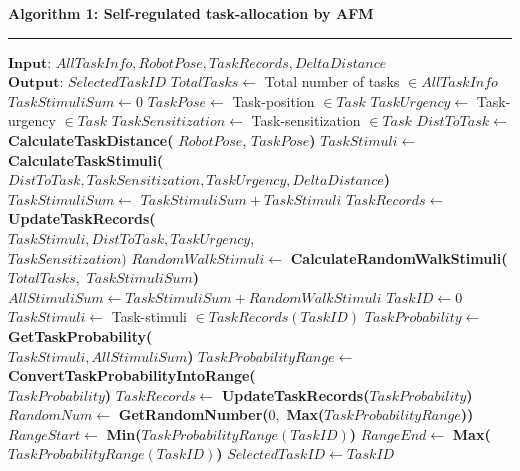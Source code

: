\documentclass[final,5p,times,twocolumn]{elsarticle}
\newcommand{\HRule}{\rule{\linewidth}{0.3mm}}
\begin{document}
\textbf{Algorithm 1: Self-regulated task-allocation by AFM}
\vspace{-3mm}
\newline
\HRule
\begin{algorithmic}[1]
\begin{small}
\label{alg:task-selector}
\State $\textbf{Input: } AllTaskInfo, RobotPose, TaskRecords, DeltaDistance$
\State $\textbf{Output: } SelectedTaskID$
\State {}
\State $TotalTasks \gets$  Total number of tasks $\in AllTaskInfo$  
\State $ TaskStimuliSum \gets 0 $
\State $ TaskPose \gets  $ Task-position  $ \in Task$
\State $ TaskUrgency \gets $ Task-urgency $ \in Task$
\State $ TaskSensitization \gets $ Task-sensitization $\in Task$
\State $ DistToTask \gets$
\textbf{CalculateTaskDistance(}
\newline
$RobotPose$, $TaskPose$\textbf{)}
\State $ TaskStimuli \gets  $ \textbf{CalculateTaskStimuli(}
\newline
$DistToTask, TaskSensitization, TaskUrgency, DeltaDistance$\textbf{)}
\State $ TaskStimuliSum \gets$  $TaskStimuliSum + TaskStimuli$
\State $ TaskRecords \gets $ \textbf{UpdateTaskRecords(\\}$TaskStimuli,DistToTask, TaskUrgency,$\\ $TaskSensitization\textbf{)}$
\EndFor
\State $RandomWalkStimuli \gets $ \textbf{CalculateRandomWalkStimuli(\\}$TotalTasks,$ %
 $TaskStimuliSum$\textbf{)}
\State $ AllStimuliSum \gets TaskStimuliSum + RandomWalkStimuli $
\State {}
\State $ TaskID \gets 0 $ 
\State $ TaskStimuli \gets $ Task-stimuli $\in TaskRecords(TaskID)$
\State $ TaskProbability \gets  $ \textbf{GetTaskProbability(\\}$TaskStimuli, AllStimuliSum$\textbf{)}
\State $ TaskProbabilityRange \gets $
\newline
 \textbf{ConvertTaskProbabilityIntoRange(}\\ $TaskProbability$\textbf{)}
\State $ TaskRecords \gets  $ \textbf{UpdateTaskRecords(}$TaskProbability$\textbf{)}
\EndWhile
\State {}
\State $ RandomNum \gets  $ 
\newline
\textbf{GetRandomNumber(}$0,$ \textbf{Max(}$TaskProbabilityRange$\textbf{))}
\State $ RangeStart \gets  $ \textbf{Min(}$TaskProbabilityRange (TaskID)$\textbf{)}
\State $ RangeEnd \gets  $ \textbf{Max(}$TaskProbabilityRange (TaskID)$\textbf{)}
\State $ SelectedTaskID \gets TaskID $ 
\EndIf
\EndWhile
\end{small}
\end{algorithmic}
\end{document}
